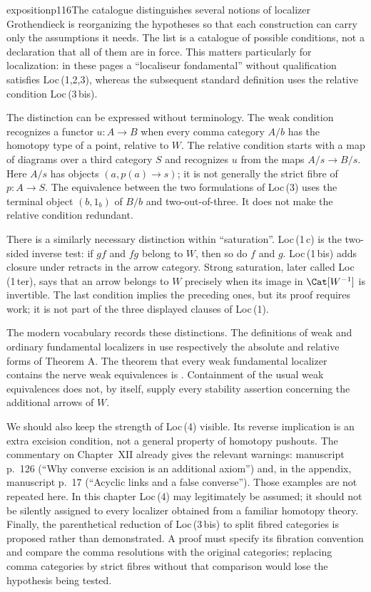 \begin{dcomment}{exposition}{p116}{The catalogue distinguishes several notions of localizer}
Grothendieck is reorganizing the hypotheses so that each construction can carry only the assumptions it needs. The list is a catalogue of possible conditions, not a declaration that all of them are in force. This matters particularly for localization: in these pages a ``localiseur fondamental'' without qualification satisfies Loc\,(1,2,3), whereas the subsequent standard definition uses the relative condition Loc\,(3\,bis).

The distinction can be expressed without terminology. The weak condition recognizes a functor $u:A\longrightarrow B$ when every comma category $A/b$ has the homotopy type of a point, relative to $W$. The relative condition starts with a map of diagrams over a third category $S$ and recognizes $u$ from the maps $A/s\longrightarrow B/s$. Here $A/s$ has objects $(a,p(a)\longrightarrow s)$; it is not generally the strict fibre of $p:A\longrightarrow S$. The equivalence between the two formulations of Loc\,(3) uses the terminal object $(b,1_b)$ of $B/b$ and two-out-of-three. It does not make the relative condition redundant.

There is a similarly necessary distinction within ``saturation''. Loc\,(1\,c) is the two-sided inverse test: if $gf$ and $fg$ belong to $W$, then so do $f$ and $g$. Loc\,(1\,bis) adds closure under retracts in the arrow category. Strong saturation, later called Loc\,(1\,ter), says that an arrow belongs to $W$ precisely when its image in $\Cat[W^{-1}]$ is invertible. The last condition implies the preceding ones, but its proof requires work; it is not part of the three displayed clauses of Loc\,(1).

The modern vocabulary records these distinctions. The definitions of weak and ordinary fundamental localizers in \citet[\S\S1.1 and 2.1]{Maltsiniotis2020} use respectively the absolute and relative forms of Theorem A. The theorem that every weak fundamental localizer contains the nerve weak equivalences is \citet[Theorem 6.1.18]{Cisinski2006}. Containment of the usual weak equivalences does not, by itself, supply every stability assertion concerning the additional arrows of $W$.

We should also keep the strength of Loc\,(4) visible. Its reverse implication is an extra excision condition, not a general property of homotopy pushouts. The commentary on Chapter~XII already gives the relevant warnings: manuscript p.~126 (``Why converse excision is an additional axiom'') and, in the appendix, manuscript p.~17 (``Acyclic links and a false converse''). Those examples are not repeated here. In this chapter Loc\,(4) may legitimately be assumed; it should not be silently assigned to every localizer obtained from a familiar homotopy theory. Finally, the parenthetical reduction of Loc\,(3\,bis) to split fibred categories is proposed rather than demonstrated. A proof must specify its fibration convention and compare the comma resolutions with the original categories; replacing comma categories by strict fibres without that comparison would lose the hypothesis being tested.
\end{dcomment}

